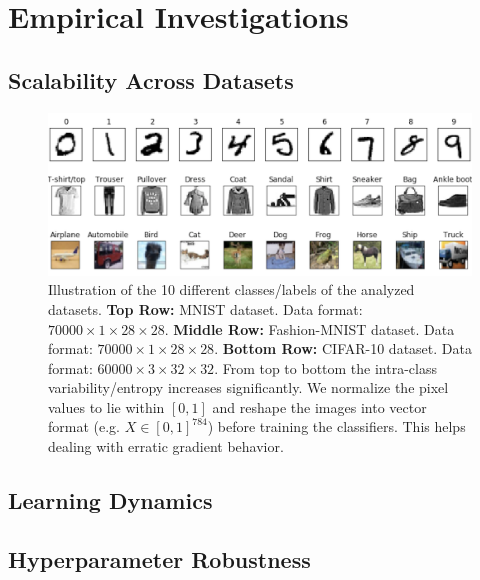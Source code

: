 \documentclass[colorinlistoftodos]{article}
\theoremstyle{definition}
\begin{document}
\newpage
\section{Empirical Investigations}

\subsection*{Scalability Across Datasets}

\begin{figure}[H]
	\centering
	\includegraphics[width=\textwidth]{../figures/report/datasets}
	\caption{Illustration of the 10 different classes/labels of the analyzed datasets. \textbf{Top Row:} MNIST dataset. Data format: $70000 \times 1 \times 28 \times 28$. \textbf{Middle Row:} Fashion-MNIST dataset. Data format: $70000 \times 1 \times 28 \times 28$. \textbf{Bottom Row:} CIFAR-10 dataset. Data format: $60000 \times 3 \times 32 \times 32$. From top to bottom the intra-class variability/entropy increases significantly. We normalize the pixel values to lie within $[0, 1]$ and reshape the images into vector format (e.g. $X \in [0, 1]^{784}$) before training the classifiers. This helps dealing with erratic gradient behavior.}	
\end{figure}


\subsection*{Learning Dynamics}


\subsection*{Hyperparameter Robustness}
\end{document}
